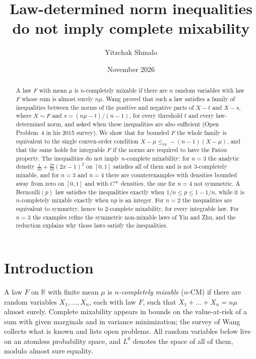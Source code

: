 \documentclass[11pt]{amsart}
\title[Norm inequalities and complete mixability]{Law-determined norm inequalities do not imply complete mixability}
\author{Yitzchak Shmalo}
\date{November 2026}
\theoremstyle{definition}
\newcommand{\R}{\mathbb{R}}
\newcommand{\cx}{\le_{\mathrm{cx}}}
\begin{document}
\begin{abstract}
A law $F$ with mean $\mu$ is $n$-completely mixable if there are $n$ random variables with law $F$ whose sum is
almost surely $n\mu$. Wang proved that such a law satisfies a family of inequalities between the norms of the
positive and negative parts of $X-t$ and $X-s$, where $X\sim F$ and $s=(n\mu-t)/(n-1)$, for every threshold $t$ and
every law-determined norm, and asked when these inequalities are also sufficient (Open Problem~4 in his 2015
survey). We show that for bounded $F$ the whole family is equivalent to the single convex-order condition
$X-\mu\cx-(n-1)(X-\mu)$, and that the same holds for integrable $F$ if the norms are required to have the Fatou
property. The inequalities do not imply $n$-complete mixability: for $n=3$ the analytic density
$\frac1{10}+\frac{27}{10}(2x-1)^2$ on $[0,1]$ satisfies all of them and is not $3$-completely mixable, and for $n=3$
and $n=4$ there are counterexamples with densities bounded away from zero on $[0,1]$ and with $C^\infty$ densities,
the one for $n=4$ not symmetric. A Bernoulli$(p)$ law satisfies the inequalities exactly when $1/n\le p\le1-1/n$,
while it is $n$-completely mixable exactly when $np$ is an integer. For $n=2$ the inequalities are equivalent to
symmetry, hence to $2$-complete mixability, for every integrable law. For $n=3$ the examples refine the symmetric
non-mixable laws of Yin and Zhu, and the reduction explains why those laws satisfy the inequalities.
\end{abstract}
\maketitle

\section{Introduction}\label{sec:intro}

A law $F$ on $\R$ with finite mean $\mu$ is \emph{$n$-completely mixable} ($n$-CM) if there are random variables
$X_1,\dots,X_n$, each with law $F$, such that $X_1+\dots+X_n=n\mu$ almost surely. Complete mixability appears in
bounds on the value-at-risk of a sum with given marginals and in variance minimization; the survey of
Wang~\cite{W15} collects what is known and lists open problems. All random variables below live on an atomless
probability space, and $L^0$ denotes the space of all of them, modulo almost sure equality.
\end{document}
